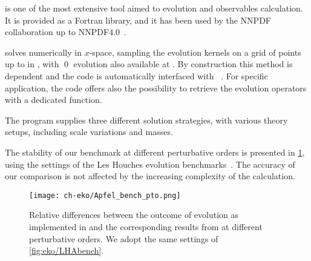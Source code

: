 \apfel{} \cite{Bertone:2013vaa} is one of the most extensive tool aimed to
\pdf{}  evolution and \dis{} observables calculation.
It is provided as a Fortran library, and it has been used by the NNPDF
collaboration up to NNPDF4.0~\cite{NNPDF:2021njg}.

\apfel{} solves \dglap{} numerically in $x$-space, sampling the evolution
kernels on a grid of points up to \nnlo{} in \qcd{}, with \qed{} evolution also
available at \lo{}.
By construction this method is \pdf{} dependent and the code is automatically
interfaced with \lhapdf{}~\cite{Buckley:2014ana}. For specific application,
the code offers also the possibility to retrieve the evolution operators
with a dedicated function.

The program supplies three different solution strategies, with various theory
setups, including scale variations and \msbar{} masses.

The stability of our benchmark at different perturbative orders is presented in \cref{fig:eko/Apfelbench_pto},
using the settings of the Les Houches \pdf{} evolution benchmarks~\cite{Giele:2002hx,Dittmar:2005ed}.
The accuracy of our comparison is not affected by the increasing complexity
of the calculation.

\begin{figure}
    \texttt{[image: ch-eko/Apfel\_bench\_pto.png]}
    \caption{Relative differences between the outcome of evolution as
        implemented in \eko{} and the corresponding results from \apfel{} at
        different perturbative orders.  We adopt the same settings of
        \cref{fig:eko/LHAbench}.}
    \label{fig:eko/Apfelbench_pto}
\end{figure}
